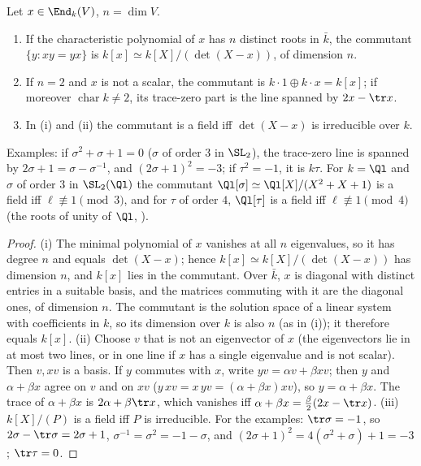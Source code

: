 \begin{lemma}\label{lem:reps:commutant}
Let $x\in\End_k(V)$, $n=\dim V$.
\begin{enumerate}[label=(\roman*)]
\item If the characteristic polynomial of $x$ has $n$ distinct roots in $\bar k$, the commutant $\{y:xy=yx\}$ is $k[x]\simeq k[X]/(\det(X-x))$, of
dimension $n$.
\item If $n=2$ and $x$ is not a scalar, the commutant is $k\cdot1\oplus k\cdot x=k[x]$; if moreover $\operatorname{char}k\ne2$, its trace-zero part is the line
spanned by $2x-\tr x$.
\item In (i) and (ii) the commutant is a field iff $\det(X-x)$ is irreducible over $k$.
\end{enumerate}
Examples: if $\sigma^2+\sigma+1=0$ ($\sigma$ of order $3$ in $\SL_2$), the trace-zero line is spanned by $2\sigma+1=\sigma-\sigma^{-1}$, and $(2\sigma+1)^2=-3$; if $\tau^2=-1$, it is $k\tau$.
For $k=\Ql$ and $\sigma$ of order $3$ in $\SL_2(\Ql)$ the commutant $\Ql[\sigma]\simeq\Ql[X]/(X^2+X+1)$ is a field iff $\ell\not\equiv1\pmod3$, and for $\tau$ of order $4$,
$\Ql[\tau]$ is a field iff $\ell\not\equiv1\pmod4$ (the roots of unity of $\Ql$, ).
\end{lemma}

\begin{proof}
(i) The minimal polynomial of $x$ vanishes at all $n$ eigenvalues, so it has degree $n$ and equals $\det(X-x)$; hence $k[x]\simeq k[X]/(\det(X-x))$ has
dimension $n$, and $k[x]$ lies in the commutant. Over $\bar k$, $x$ is diagonal with distinct entries in a suitable basis, and the matrices
commuting with it are the diagonal ones, of dimension $n$. The commutant is the solution space of a linear system with coefficients
in $k$, so its dimension over $k$ is also $n$ (as in (i)); it therefore equals $k[x]$.
(ii) Choose $v$ that is not an eigenvector of $x$ (the eigenvectors lie in at most two lines, or in one line if $x$ has a single eigenvalue
and is not scalar). Then $v,xv$ is a basis. If $y$ commutes with $x$, write $yv=\alpha v+\beta xv$; then $y$ and $\alpha+\beta x$ agree on $v$ and on $xv$
($y\,xv=x\,yv=(\alpha+\beta x)xv$), so $y=\alpha+\beta x$. The trace of $\alpha+\beta x$ is $2\alpha+\beta\tr x$, which vanishes iff $\alpha+\beta x=\frac\beta2(2x-\tr x)$.
(iii) $k[X]/(P)$ is a field iff $P$ is irreducible. For the examples: $\tr\sigma=-1$, so $2\sigma-\tr\sigma=2\sigma+1$, $\sigma^{-1}=\sigma^2=-1-\sigma$, and
$(2\sigma+1)^2=4(\sigma^2+\sigma)+1=-3$; $\tr\tau=0$.
\end{proof}

